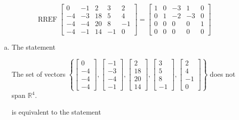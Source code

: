 \begin{exerciseAnswer} 


\[\operatorname{RREF} \left[\begin{array}{ccccc}
0 & -1 & 2 & 3 & 2 \\
-4 & -3 & 18 & 5 & 4 \\
-4 & -4 & 20 & 8 & -1 \\
-4 & -1 & 14 & -1 & 0
\end{array}\right] = \left[\begin{array}{ccccc}
1 & 0 & -3 & 1 & 0 \\
0 & 1 & -2 & -3 & 0 \\
0 & 0 & 0 & 0 & 1 \\
0 & 0 & 0 & 0 & 0
\end{array}\right] \]


\begin{enumerate}[(a)]
\item The statement 
\begin{center}\begin{minipage}{0.8\textwidth}
 The set of vectors \( \left\{ \left[\begin{array}{c}
0 \\
-4 \\
-4 \\
-4
\end{array}\right] , \left[\begin{array}{c}
-1 \\
-3 \\
-4 \\
-1
\end{array}\right] , \left[\begin{array}{c}
2 \\
18 \\
20 \\
14
\end{array}\right] , \left[\begin{array}{c}
3 \\
5 \\
8 \\
-1
\end{array}\right] , \left[\begin{array}{c}
2 \\
4 \\
-1 \\
0
\end{array}\right] \right\} \) does not span \(\mathbb{R}^4\). 
\end{minipage}\end{center}
     is equivalent to the statement 

\end{enumerate}
\end{exerciseAnswer}

